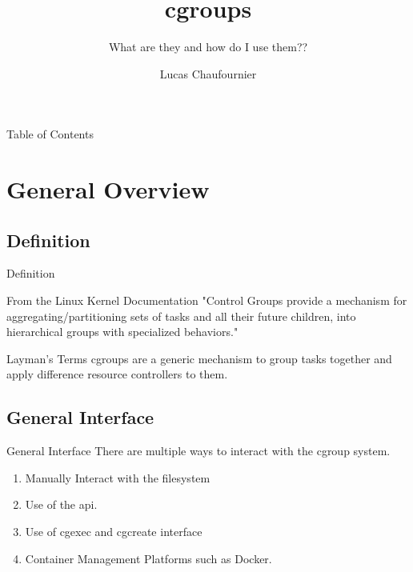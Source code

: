 \documentclass[pdf]{beamer}
\title{cgroups}
\subtitle{What are they and how do I use them??}
\author{Lucas Chaufournier}
\begin{document}


\begin{frame}
\titlepage
\end{frame}


\begin{frame}{Table of Contents}
	\tableofcontents
\end{frame}


\section{General Overview}
\subsection{Definition}
\begin{frame}{Definition}

\begin{block}{From the Linux Kernel Documentation}
"Control Groups provide a mechanism for aggregating/partitioning sets of tasks and all their future children, into hierarchical groups with specialized behaviors."
\end{block}
\pause
\begin{block}{Layman's Terms}
cgroups are a generic mechanism to group tasks together and apply difference resource controllers to them.
\end{block}

\end{frame}

\subsection{General Interface}
\begin{frame}{General Interface}
There are multiple ways to interact with the cgroup system.
\begin{enumerate}
\item {}Manually Interact with the filesystem
\item {}Use of the api.
\item {}Use of cgexec and cgcreate interface
\item {}Container Management Platforms such as Docker.
\end{enumerate}

\end{frame}
\end{document}
